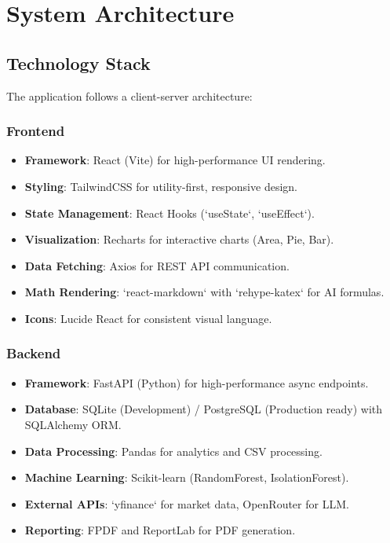 \documentclass[12pt, a4paper]{report}
\begin{document}
\chapter{System Architecture}
\section{Technology Stack}
The application follows a client-server architecture:

\subsection{Frontend}
\begin{itemize}
    \item \textbf{Framework}: React (Vite) for high-performance UI rendering.
    \item \textbf{Styling}: TailwindCSS for utility-first, responsive design.
    \item \textbf{State Management}: React Hooks (`useState`, `useEffect`).
    \item \textbf{Visualization}: Recharts for interactive charts (Area, Pie, Bar).
    \item \textbf{Data Fetching}: Axios for REST API communication.
    \item \textbf{Math Rendering}: `react-markdown` with `rehype-katex` for AI formulas.
    \item \textbf{Icons}: Lucide React for consistent visual language.
\end{itemize}

\subsection{Backend}
\begin{itemize}
    \item \textbf{Framework}: FastAPI (Python) for high-performance async endpoints.
    \item \textbf{Database}: SQLite (Development) / PostgreSQL (Production ready) with SQLAlchemy ORM.
    \item \textbf{Data Processing}: Pandas for analytics and CSV processing.
    \item \textbf{Machine Learning}: Scikit-learn (RandomForest, IsolationForest).
    \item \textbf{External APIs}: `yfinance` for market data, OpenRouter for LLM.
    \item \textbf{Reporting}: FPDF and ReportLab for PDF generation.
\end{itemize}
\end{document}
